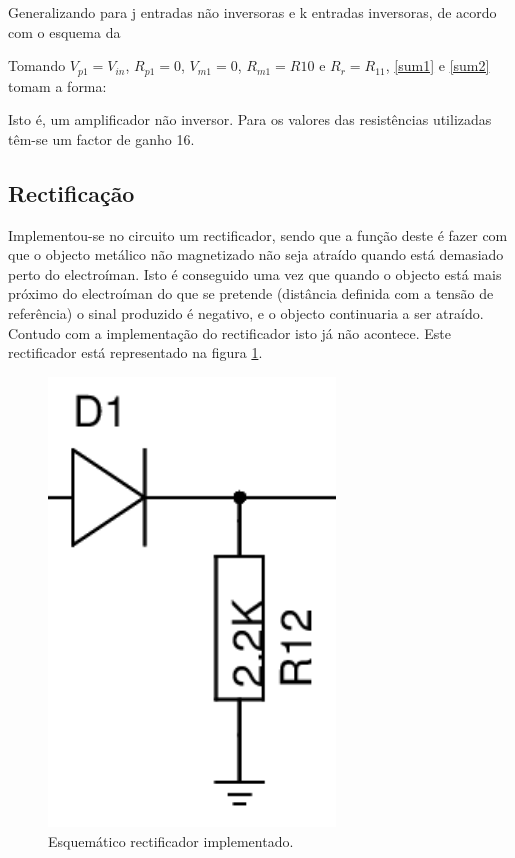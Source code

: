 \documentclass[%
  reprint,
  nofootinbib,
  amsmath,amssymb,
  aps,
  10pt,
  a4paper
]{revtex4-1}
\begin{document}

Generalizando para j entradas não inversoras e k entradas inversoras, de acordo com o esquema da 

Tomando $V_{p1}=V_{in}$, $R_{p1}=0$, $V_{m1}=0$, $R_{m1}=R10$ e $R_r = R_{11}$, \eqref{sum1} e \eqref{sum2} tomam a forma:

Isto é, um amplificador não inversor. Para os valores das resistências utilizadas têm-se um factor de ganho 16.








\subsection{Rectificação}
Implementou-se no circuito um rectificador, sendo que a função deste é fazer com que o objecto metálico não magnetizado não seja atraído quando está demasiado perto do electroíman. Isto é conseguido uma vez que quando o objecto está mais próximo do electroíman do que se pretende (distância definida com a tensão de referência) o sinal produzido é negativo, e o objecto continuaria a ser atraído. Contudo com a implementação do rectificador isto já não acontece. Este rectificador está representado na figura \ref{fig:rectificador}.
\begin{figure}[h]
\includegraphics[width=3in]{../img/rectificador.png}
\caption{Esquemático rectificador implementado.}
\label{fig:rectificador}
\end{figure}
\end{document}
